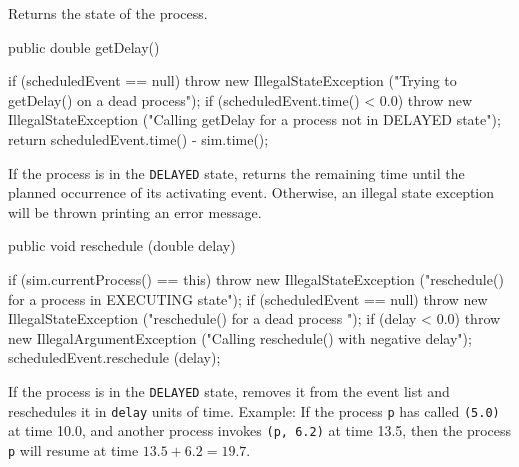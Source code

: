   \begin{tabb}  Returns the state of the process.
  \end{tabb}
\begin{htmlonly}
\end{htmlonly}
\begin{code}

   public double getDelay() \begin{hide} {
      if (scheduledEvent == null)
         throw new IllegalStateException ("Trying to getDelay() on a dead process");
      if (scheduledEvent.time() < 0.0)
         throw new IllegalStateException
                   ("Calling getDelay for a process not in DELAYED state");
      return scheduledEvent.time() - sim.time();
   } \end{hide}
\end{code}
  \begin{tabb}  If the process is in the \texttt{DELAYED} state, returns
   the remaining time until the planned occurrence of its
   activating event.
   Otherwise, an illegal state exception will be thrown printing an error message.
  \end{tabb}
\begin{htmlonly}
\end{htmlonly}
\begin{code}

   public void reschedule (double delay) \begin{hide} {
      if (sim.currentProcess() == this)
         throw new IllegalStateException
                   ("reschedule() for a process in EXECUTING state");
      if (scheduledEvent == null)
         throw new IllegalStateException ("reschedule() for a dead process ");
      if (delay < 0.0) throw new IllegalArgumentException
                                 ("Calling reschedule() with negative delay");
      scheduledEvent.reschedule (delay);
   } \end{hide}
\end{code}
  \begin{tabb}  If the process is in the \texttt{DELAYED} state, removes it from
   the event list and reschedules it in \texttt{delay} units of time.
   Example: If the process \texttt{p} has called \texttt{(5.0)}
   at time 10.0, and another process invokes \texttt{(p, 6.2)}
   at time 13.5, then the process \texttt{p} will resume at time
   $13.5 + 6.2 = 19.7$.
  \end{tabb}
